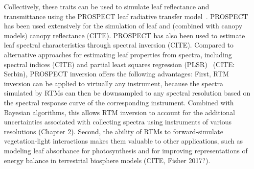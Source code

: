 Collectively, these traits can be used to simulate leaf reflectance and transmittance using the PROSPECT leaf radiative transfer model~\cite{jacquemoud1990_prospect,feret2008_prospect,feret2017_prospectd}.
% 
% 
% 
% 
% 
% 
%
PROSPECT has been used extensively for the simulation of leaf and (combined with canopy models) canopy reflectance (CITE).
PROSPECT has also been used to estimate leaf spectral characteristics through spectral inversion (CITE).
Compared to alternative approaches for estimating leaf properties from spectra, including spectral indices (CITE) and partial least squares regression (PLSR)~\cite{barnes_2017_beyond} (CITE: Serbin), PROSPECT inversion offers the following advantages:
First, RTM inversion can be applied to virtually any instrument, because the spectra simulated by RTMs can then be downsampled to any spectral resolution based on the spectral response curve of the corresponding instrument.
% 
% 
% 
Combined with Bayesian algorithms, this allows RTM inversion to account for the additional uncertainties associated with collecting spectra using instruments of various resolutions (Chapter 2).
Second, the ability of RTMs to forward-simulate vegetation-light interactions makes them valuable to other applications, such as modeling leaf absorbance for photosynthesis and for improving representations of energy balance in terrestrial biosphere models (CITE, Fisher 2017?).
